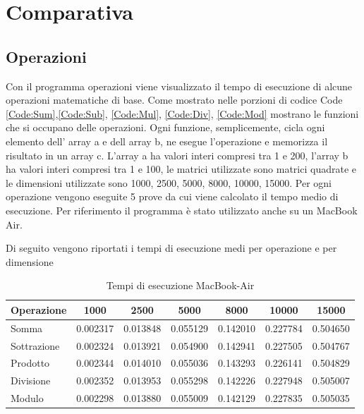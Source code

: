 \documentclass[12pt,a4paper]{report}
\begin{document}
\chapter{Comparativa}

\section{Operazioni}
	Con il programma operazioni viene visualizzato il tempo di esecuzione di alcune operazioni matematiche di base. Come mostrato nelle porzioni di codice Code \ref{Code:Sum},\ref{Code:Sub}, \ref{Code:Mul}, \ref{Code:Div}, \ref{Code:Mod} mostrano le funzioni che si occupano delle operazioni. Ogni funzione, semplicemente, cicla ogni elemento dell' array a e dell array b, ne esegue l'operazione e memorizza il risultato in un array c. L'array a ha valori interi compresi tra 1 e 200, l'array b ha valori interi compresi tra 1 e 100,  le matrici utilizzate sono matrici quadrate e le dimensioni utilizzate sono 1000, 2500, 5000, 8000, 10000, 15000. Per ogni operazione vengono eseguite 5 prove da cui viene calcolato il tempo medio di esecuzione. 
	Per riferimento il programma è stato utilizzato anche su un MacBook Air. 
	
	
	
	
	
	
	
	Di seguito vengono riportati i tempi di esecuzione medi per operazione e per dimensione
	\begin{table}[h!]
	
	\centering
	\begin{tabular}{| l | c | c | c | c | c | c |}
		\hline
		Operazione & 1000 & 2500 & 5000 & 8000 & 10000 & 15000 \\ \hline
		Somma & 0.002317 & 0.013848 & 0.055129 & 0.142010 & 0.227784 & 0.504650\\ \hline
		Sottrazione & 0.002324 & 0.013921 & 0.054900 & 0.142941 & 0.227505 & 0.504767\\ \hline
		Prodotto & 0.002344 & 0.014010 & 0.055036 & 0.143293 & 0.226141 & 0.504829\\ \hline
		Divisione & 0.002352 & 0.013953 & 0.055298 & 0.142226 & 0.227948 & 0.505007\\ \hline
		Modulo & 0.002298 & 0.013880 & 0.055009 & 0.142129 & 0.227835 & 0.505035\\ \hline

	\end{tabular}
	
	\caption{Tempi di esecuzione MacBook-Air}
	\end{table}
	
\end{document}
